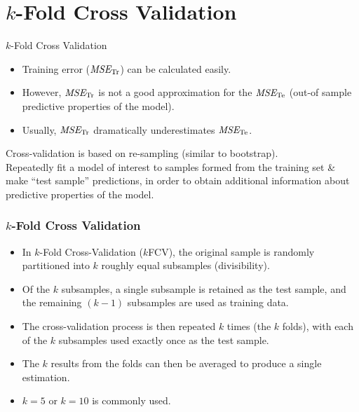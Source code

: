 \documentclass{beamer}
\begin{document}
\section{$k$-Fold Cross Validation}
\begin{frame}{$k$-Fold Cross Validation}
\begin{itemize}
\item Training error ($\textit{MSE}_{\textnormal{Tr}}$) can be calculated easily. 
\item However, $\textit{MSE}_{\textnormal{Tr}}$ is not a good approximation for the $\textit{MSE}_{\textnormal{Te}}$ (out-of sample predictive properties of the model).
\item Usually, $\textit{MSE}_{\textnormal{Tr}}$ dramatically underestimates $\textit{MSE}_{\textnormal{Te}}$.
\end{itemize}
\bigskip
Cross-validation is based on re-sampling (similar to bootstrap).\\
\medskip
Repeatedly fit a model of interest to samples formed from the training set \& make ``test sample'' predictions, in order to obtain additional information about predictive properties of the model.\\
\end{frame}
\begin{frame}
\frametitle{$k$-Fold Cross Validation}

\begin{itemize}
  \item In $k$-Fold Cross-Validation ($k$FCV), the original sample is randomly partitioned into $k$ roughly equal subsamples (divisibility). 
  \item Of the $k$ subsamples, a single subsample is retained as the test sample, and the remaining $(k-1)$ subsamples are used as training data. 
  \item The cross-validation process is then repeated $k$ times (the $k$ folds), with each of the $k$ subsamples used exactly once as the test sample. 
  \item The $k$ results from the folds can then be averaged to produce a single estimation. 
  \item $k = 5$ or $k=10$ is commonly used.
\end{itemize}  
\end{frame}
\end{document}
